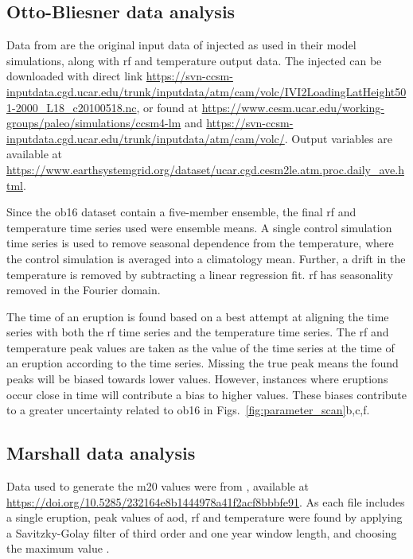 \documentclass{ametsocV6.1}
\newcommand{\iso}[1][i]{{#1}njected \ce{SO2}}
\begin{document}
\appendix[B]


\subsection{Otto-Bliesner data analysis}\label{ap:ob16}

Data from \citet{ottobliesner2016} are the original input data of \iso{} as used in
their model simulations, along with \gls{rf} and temperature output data. The \iso{} can
be downloaded with direct link
\url{https://svn-ccsm-inputdata.cgd.ucar.edu/trunk/inputdata/atm/cam/volc/IVI2LoadingLatHeight501-2000_L18_c20100518.nc},
or found at \url{https://www.cesm.ucar.edu/working-groups/paleo/simulations/ccsm4-lm}
and \url{https://svn-ccsm-inputdata.cgd.ucar.edu/trunk/inputdata/atm/cam/volc/}. Output
variables are available at
\url{https://www.earthsystemgrid.org/dataset/ucar.cgd.cesm2le.atm.proc.daily_ave.html}.

Since the \gls{ob16} dataset contain a five-member ensemble, the final \gls{rf} and
temperature time series used were ensemble means. A single control simulation time
series is used to remove seasonal dependence from the temperature, where the control
simulation is averaged into a climatology mean. Further, a drift in the temperature is
removed by subtracting a linear regression fit. \gls{rf} has seasonality removed in the
Fourier domain.

The time of an eruption is found based on a best attempt at aligning the  time
series with both the \gls{rf} time series and the temperature time series. The \gls{rf}
and temperature peak values are taken as the value of the time series at the time of an
eruption according to the  time series. Missing the true peak means the found
peaks will be biased towards lower values. However, instances where eruptions occur
close in time will contribute a bias to higher values. These biases contribute to a
greater uncertainty related to \gls{ob16} in Figs.~\ref{fig:parameter_scan}b,c,f.

\subsection{Marshall data analysis}\label{ap:m20}

Data used to generate the \gls{m20} values were from \citet{marshall2020dataset},
available at \url{https://doi.org/10.5285/232164e8b1444978a41f2acf8bbbfe91}. As each
file includes a single eruption, peak values of \gls{aod}, \gls{rf} and temperature were
found by applying a Savitzky-Golay filter of third order and one year window length, and
choosing the maximum value \citep{savitzky1964}.
\end{document}
